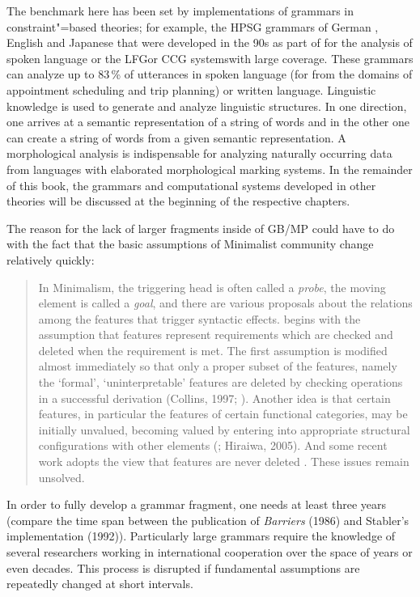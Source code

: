 The benchmark here has been set by implementations of grammars in constraint"=based theories; for example, the
HPSG grammars of German \citep{MK2000a}, English \citep*{FCS2000a} and
Japanese \citep{Siegel2000a} that were developed
in the 90s as part of \verbmobil \citep{Wahlster2000a-ed-not-crossreferenced} for the analysis of spoken language  or
the LFG\indexlfg or CCG systems\indexccg with large coverage. These grammars can analyze up to 83\,\% of utterances in spoken language
(for \verbmobil from the domains of appointment scheduling and trip planning) or written language. Linguistic knowledge is used to generate and analyze 
linguistic structures. In one direction, one arrives at a semantic representation of a string of words and in the other one can create a string
of words from a given semantic representation. A morphological analysis is indispensable for analyzing naturally occurring data from languages with
elaborated morphological marking systems. In the remainder of this book, the grammars and computational systems developed in other theories will be discussed at the beginning of the
respective chapters.

The reason for the lack of larger fragments inside of GB/MP could have to do with the fact that the basic assumptions of Minimalist community
change relatively quickly:
\begin{quote}
\label{Zitat-Stabler}
In Minimalism, the triggering head is often called a \emph{probe}, the moving element is called a
\emph{goal}, and there are various proposals about the relations among the features that trigger
syntactic effects. \citet[p.\,229]{Chomsky95a-u} begins with the assumption that features represent
requirements which are checked and deleted when the requirement is met. The first assumption is
modified almost immediately so that only a proper subset of the features, namely the `formal',
`uninterpretable' features are deleted by checking operations in a successful derivation (Collins,
1997; \citealp[§4.5]{Chomsky95a-u}). Another idea is that certain features, in particular the
features of certain functional categories, may be initially unvalued, becoming valued by entering
into appropriate structural configurations with other elements (\citealp{Chomsky2008a}; Hiraiwa,
2005). And some recent work adopts the view that features are never deleted
\citep[p.\,11]{Chomsky2007a}. These issues remain unsolved. \citep[]{Stabler2010a} 
\end{quote}
In order to fully develop a grammar fragment, one needs at least three years (compare the time span between the publication of \emph{Barriers} (1986)
and Stabler's implementation (1992)). Particularly large grammars require the knowledge of several researchers working in international cooperation
over the space of years or even decades. This process is disrupted if fundamental assumptions are repeatedly changed at short intervals.



